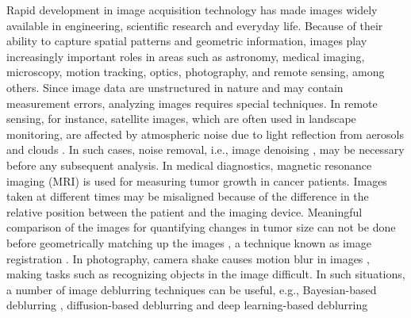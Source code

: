 Rapid development in image acquisition technology has made images widely available in engineering, scientific research and everyday life. Because of their ability to capture spatial patterns and geometric information, images play increasingly important roles in areas such as astronomy, medical imaging, microscopy, motion tracking, optics, photography, and remote sensing, among others. Since image data are unstructured in nature and may contain measurement errors, analyzing images requires special techniques. In remote sensing, for instance, satellite images, which are often used in landscape monitoring, are affected by atmospheric noise due to light reflection from aerosols and clouds \citep{boonprong2018classification}. In such cases, noise removal, i.e., image denoising \citep{buades2005review, polzehl2000adaptive}, may be necessary before any subsequent analysis. In medical diagnostics, magnetic resonance imaging (MRI) is used for measuring tumor growth in cancer patients. Images taken at different times may be misaligned because of the difference in the relative position between the patient and the imaging device. Meaningful comparison of the images for quantifying changes in tumor size can not be done before geometrically matching up the images \citep{klein2009evaluation}, a technique known as image registration \citep{zitova2003image}. In photography, camera shake causes motion blur in images \citep{bai2018graph}, making tasks such as recognizing objects in the image difficult. In such situations, a number of image deblurring techniques can be useful, e.g., Bayesian-based deblurring \citep{wang2011analyzing}, diffusion-based deblurring \citep{yue2025efficient} and deep learning-based deblurring \citep{quan2025deep}


